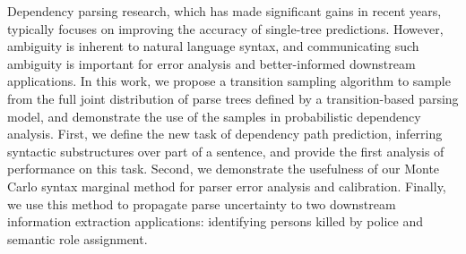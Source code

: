 Dependency parsing research, which has made significant gains in recent years, typically focuses on improving the accuracy of single-tree predictions. However, ambiguity is inherent to natural language syntax, and communicating such ambiguity is important for error analysis and better-informed downstream applications. In this work, we propose a transition sampling algorithm to sample from the full joint distribution of parse trees defined by a transition-based parsing model, and demonstrate the use of the samples in probabilistic dependency analysis. First, we define the new task of dependency path prediction, inferring syntactic substructures over part of a sentence, and provide the first analysis of performance on this task. Second, we demonstrate the usefulness of our Monte Carlo syntax marginal method for parser error analysis and calibration. Finally, we use this method to propagate parse uncertainty to two downstream information extraction applications: identifying persons killed by police and semantic role assignment.
